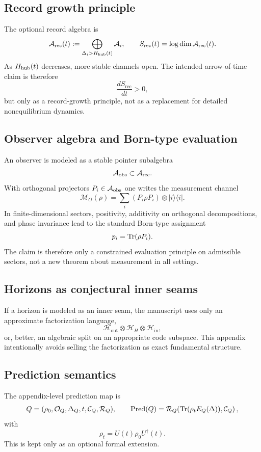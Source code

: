\subsection{Record growth principle}

The optional record algebra is
\[
\mathcal A_{\mathrm{rec}}(t):=\bigoplus_{\Delta_i>H_{\mathrm{hub}}(t)}\mathcal A_i,
\qquad
S_{\mathrm{rec}}(t)=\log\dim\mathcal A_{\mathrm{rec}}(t).
\]
As $H_{\mathrm{hub}}(t)$ decreases, more stable channels open. The intended arrow-of-time claim is therefore
\[
\frac{dS_{\mathrm{rec}}}{dt}>0,
\]
but only as a record-growth principle, not as a replacement for detailed nonequilibrium dynamics.

\subsection{Observer algebra and Born-type evaluation}

An observer is modeled as a stable pointer subalgebra
\[
\mathcal A_{\mathrm{obs}}\subset\mathcal A_{\mathrm{rec}}.
\]
With orthogonal projectors $P_i\in\mathcal A_{\mathrm{obs}}$ one writes the measurement channel
\[
\mathcal M_O(\rho)=\sum_i(P_i\rho P_i)\otimes |i\rangle\langle i|.
\]
In finite-dimensional sectors, positivity, additivity on orthogonal decompositions, and phase invariance lead to the standard Born-type assignment
\[
p_i=\operatorname{Tr}(\rho P_i).
\]
The claim is therefore only a constrained evaluation principle on admissible sectors, not a new theorem about measurement in all settings.

\subsection{Horizons as conjectural inner seams}

If a horizon is modeled as an inner seam, the manuscript uses only an approximate factorization language,
\[
\mathcal H_{\mathrm{out}}\otimes\mathcal H_H\otimes\mathcal H_{\mathrm{in}},
\]
or, better, an algebraic split on an appropriate code subspace. This appendix intentionally avoids selling the factorization as exact fundamental structure.

\subsection{Prediction semantics}

The appendix-level prediction map is
\[
Q=(\rho_0,\mathcal O_Q,\Delta_Q,t,\mathcal C_Q,\mathcal R_Q),
\qquad
\operatorname{Pred}(Q)=\mathcal R_Q\!\left(\operatorname{Tr}(\rho_tE_Q(\Delta)),\mathcal C_Q\right),
\]
with
\[
\rho_t=U(t)\rho_0U^\dagger(t).
\]
This is kept only as an optional formal extension.

